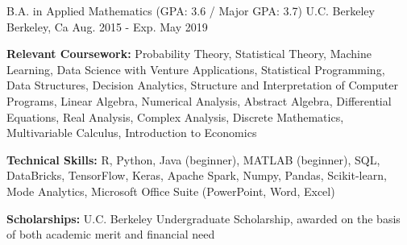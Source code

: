 

\begin{cventries}

  \cventry
    {B.A. in Applied Mathematics (GPA: 3.6 / Major GPA: 3.7)} %
    {U.C. Berkeley} %
    {Berkeley, Ca} %
    {Aug. 2015 - Exp. May 2019} %
    {
      \begin{cvitems} %
        \item \textbf{Relevant Coursework:}{ Probability Theory, Statistical Theory, Machine Learning, Data Science with Venture Applications, Statistical Programming, Data Structures, Decision Analytics, Structure and Interpretation of Computer Programs, Linear Algebra, Numerical Analysis, Abstract Algebra, Differential Equations, Real Analysis, Complex Analysis, Discrete Mathematics, Multivariable Calculus, Introduction to Economics}
        \item \textbf{Technical Skills:}{ R, Python, Java (beginner), MATLAB (beginner), SQL, DataBricks, TensorFlow, Keras, Apache Spark, Numpy, Pandas, Scikit-learn, Mode Analytics, Microsoft Office Suite (PowerPoint, Word, Excel)}
        \item \textbf{Scholarships:}{ U.C. Berkeley Undergraduate Scholarship, awarded on the basis of both academic merit and financial need}
      \end{cvitems}
    }

\end{cventries}
